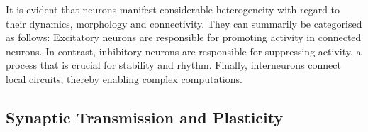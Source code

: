 



\noindent It is evident that neurons manifest considerable heterogeneity with regard to their dynamics, morphology and connectivity. They can summarily be categorised as follows: Excitatory neurons are responsible for promoting activity in connected neurons. In contrast, inhibitory neurons are responsible for suppressing activity, a process that is crucial for stability and rhythm. Finally, interneurons connect local circuits, thereby enabling complex computations.

\subsection[Synaptic Transmission and Plasticity]{Synaptic Transmission and Plasticity}

